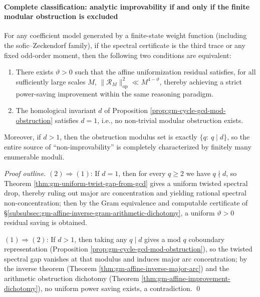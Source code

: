 \paragraph{Complete classification: analytic improvability if and only if the finite modular obstruction is excluded}
\begin{theorem}\label{thm:gm-improvability-iff-d1}
For any coefficient model generated by a finite-state weight function (including the sofic--Zeckendorf family), if the spectral certificate is the third trace or any fixed odd-order moment, then the following two conditions are equivalent:
\begin{enumerate}
  \item There exists \(\vartheta>0\) such that the affine uniformization residual satisfies, for all sufficiently large scales \(M\),
  \(
  \|\mathcal{R}_M\|_{\mathrm{op}}^2\ll M^{4-\vartheta}
  \), thereby achieving a strict power-saving improvement within the same reasoning paradigm.
  \item The homological invariant \(d\) of Proposition \ref{prop:gm-cycle-gcd-mod-obstruction} satisfies \(d=1\), i.e., no non-trivial modular obstruction exists.
\end{enumerate}
Moreover, if \(d>1\), then the obstruction modulus set is exactly \(\{q:\ q\mid d\}\), so the entire source of ``non-improvability'' is completely characterized by finitely many enumerable moduli.
\end{theorem}

\begin{proof}[Proof outline]
\((2)\Rightarrow(1)\): If \(d=1\), then for every \(q\ge 2\) we have \(q\nmid d\), so Theorem \ref{thm:gm-uniform-twist-gap-from-gcd} gives a uniform twisted spectral drop, thereby ruling out major arc concentration and yielding rational spectral non-concentration; then by the Gram equivalence and computable certificate of \S\ref{subsubsec:gm-affine-inverse-gram-arithmetic-dichotomy}, a uniform \(\vartheta>0\) residual saving is obtained.
\par
\((1)\Rightarrow(2)\): If \(d>1\), then taking any \(q\mid d\) gives a mod \(q\) coboundary representation (Proposition \ref{prop:gm-cycle-gcd-mod-obstruction}), so the twisted spectral gap vanishes at that modulus and induces major arc concentration; by the inverse theorem (Theorem \ref{thm:gm-affine-inverse-major-arc}) and the arithmetic obstruction dichotomy (Theorem \ref{thm:gm-affine-improvement-dichotomy}), no uniform power saving exists, a contradiction. \qed
\end{proof}
\endinput


